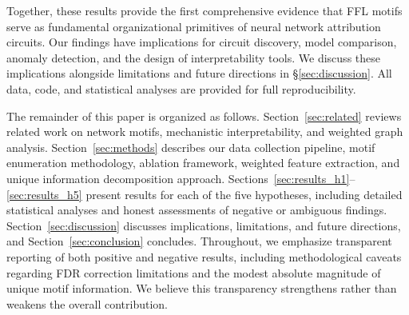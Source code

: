 Together, these results provide the first comprehensive evidence that FFL motifs serve as fundamental organizational primitives of neural network attribution circuits. Our findings have implications for circuit discovery, model comparison, anomaly detection, and the design of interpretability tools. We discuss these implications alongside limitations and future directions in \S\ref{sec:discussion}. All data, code, and statistical analyses are provided for full reproducibility.

The remainder of this paper is organized as follows. Section~\ref{sec:related} reviews related work on network motifs, mechanistic interpretability, and weighted graph analysis. Section~\ref{sec:methods} describes our data collection pipeline, motif enumeration methodology, ablation framework, weighted feature extraction, and unique information decomposition approach. Sections~\ref{sec:results_h1}--\ref{sec:results_h5} present results for each of the five hypotheses, including detailed statistical analyses and honest assessments of negative or ambiguous findings. Section~\ref{sec:discussion} discusses implications, limitations, and future directions, and Section~\ref{sec:conclusion} concludes. Throughout, we emphasize transparent reporting of both positive and negative results, including methodological caveats regarding FDR correction limitations and the modest absolute magnitude of unique motif information. We believe this transparency strengthens rather than weakens the overall contribution.